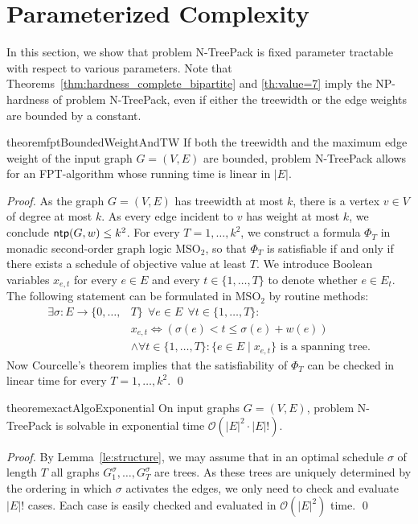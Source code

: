 \documentclass[runningheads]{llncs}
\newcommand{\set}[1]{\{ #1 \}}
\newcommand{\bigO}{\mathcal{O}}
\newcommand{\xxxNTP}{{\sc N-TreePack}}
\DeclareMathOperator{\ntp}{\text{\sf ntp}}
\begin{document}
\section{Parameterized Complexity}
\label{sec:parameterized}
In this section, we show that problem {\xxxNTP} is fixed parameter tractable with 
respect to various parameters. 
Note that Theorems~\ref{thm:hardness_complete_bipartite} and \ref{th:value=7} imply the NP-hardness 
of problem {\xxxNTP}, even if either the treewidth or the edge weights are bounded by a constant. 

\begin{restatable}{theorem}{fptBoundedWeightAndTW}
\label{th:fpt_weights_and_tw_bounded}
If both the treewidth and the maximum edge weight of the input graph $G = (V, E)$ are bounded, problem {\xxxNTP} allows for an FPT-algorithm whose running time is linear in $|E|$. 
\end{restatable}
\begin{proof}
As the graph $G=(V,E)$ has treewidth at most $k$, there is a vertex $v\in V$ of degree at most $k$.
As every edge incident to $v$ has weight at most $k$, we conclude $\ntp(G,w)\le k^2$. 
For every $T=1,\ldots,k^2$, we construct a formula $\Phi_T$ in monadic second-order 
graph logic $\text{MSO}_2$, so that $\Phi_T$ is satisfiable if and only if there exists a schedule 
of objective value at least $T$. 
We introduce Boolean variables $x_{e,t}$ for every $e\in E$ and every $t\in \{1,\dots,T\}$
to denote whether $e\in E_t$. 
The following statement can be formulated in $\text{MSO}_2$ by routine methods:
\begin{align*}
\exists \sigma: E\to\{0,\ldots,&T\} ~~\forall e\in E ~~\forall t\in\{1,\ldots,T\}: \\
& x_{e,t} \iff \left(\sigma(e) < t \leq \sigma(e) + w(e)\right)\\
& \land \forall t\in\{1,\ldots,T\}: \set{e\in E \mid x_{e,t}} \text{ is a spanning tree.}
\end{align*}
Now Courcelle's theorem \cite{courcelle1990monadic} implies that the satisfiability of $\Phi_T$ 
can be checked in linear time for every $T=1,\ldots,k^2$.
\qed
\end{proof}

\begin{restatable}{theorem}{exactAlgoExponential}
\label{th:exact}
On input graphs $G=(V,E)$, problem {\xxxNTP} is solvable in exponential time $\bigO(|E|^2\cdot|E|!)$. 
\end{restatable}
\begin{proof}
By Lemma~\ref{le:structure}, we may assume that in an optimal schedule $\sigma$ of length $T$ 
all graphs $G_1^\sigma, \dots, G_T^\sigma$ are trees.
As these trees are uniquely determined by the ordering in which $\sigma$ activates the edges,
we only need to check and evaluate $|E|!$ cases.
Each case is easily checked and evaluated in $\bigO(|E|^2)$ time.
\qed
\end{proof}
\end{document}
